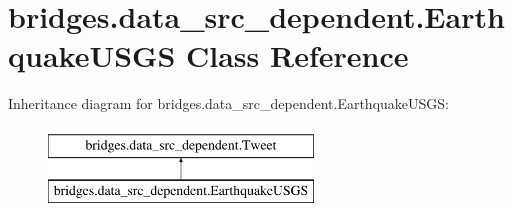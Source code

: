 \hypertarget{classbridges_1_1data__src__dependent_1_1_earthquake_u_s_g_s}{}\section{bridges.\+data\+\_\+src\+\_\+dependent.\+Earthquake\+U\+S\+G\+S Class Reference}
\label{classbridges_1_1data__src__dependent_1_1_earthquake_u_s_g_s}
Inheritance diagram for bridges.\+data\+\_\+src\+\_\+dependent.\+Earthquake\+U\+S\+G\+S\+:\begin{figure}[H]
\begin{center}
\leavevmode
\includegraphics[height=2.000000cm]{classbridges_1_1data__src__dependent_1_1_earthquake_u_s_g_s}
\end{center}
\end{figure}
